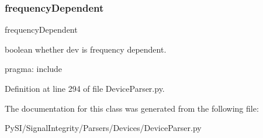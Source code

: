 \subsubsection{\texorpdfstring{frequency\+Dependent}{frequencyDependent}}
{\footnotesize\ttfamily frequency\+Dependent}



boolean whether dev is frequency dependent. 

pragma\+: include 

Definition at line 294 of file Device\+Parser.\+py.



The documentation for this class was generated from the following file\+:\begin{DoxyCompactItemize}
\item 
Py\+S\+I/\+Signal\+Integrity/\+Parsers/\+Devices/Device\+Parser.\+py\end{DoxyCompactItemize}
